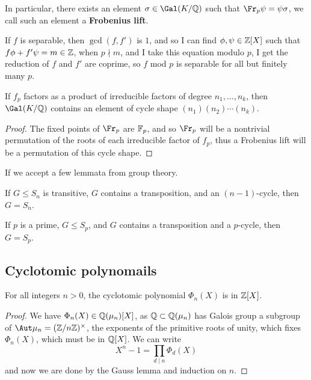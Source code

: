 \documentclass{article}
\begin{document}
In particular, there exists an element $\sigma\in \Gal(K/\bQ)$ such that $\Fr_p\psi = \psi\sigma$, we call such an element a \textbf{Frobenius lift}.

If $f$ is separable, then $\gcd(f,f')$ is $1$, and so I can find $\phi,\psi\in\mathbb{Z}[X]$ such that $f\phi + f'\psi = m\in \mathbb{Z}$, when $p\nmid m$, and I take this equation modulo $p$, I get the reduction of $f$ and $f'$ are coprime, so $f$ mod $p$ is separable for all but finitely many $p$.

\begin{corollary}
    If $f_p$ factors as a product of irreducible factors of degree $n_1,\ldots, n_k$, then $\Gal(K/\bQ)$ contains an element of cycle shape $(n_1)(n_2)\cdots (n_k)$.
    \begin{proof}
        The fixed points of $\Fr_p$ are $\mathbb{F}_p$, and so $\Fr_p$ will be a nontrivial permutation of the roots of each irreducible factor of $f_p$, thus a Frobenius lift will be a permutation of this cycle shape.
    \end{proof}
\end{corollary}

If we accept a few lemmata from group theory.

\begin{lemma}
    If $G\leq S_n$ is transitive, $G$ contains a transposition, and an $(n-1)$-cycle, then $G=S_n$.
\end{lemma}

\begin{lemma}
    If $p$ is a prime, $G\leq S_p$, and $G$ contains a transposition and a $p$-cycle, then $G=S_p$.
\end{lemma}

\subsection{Cyclotomic polynomails}

\begin{lemma}
    For all integers $n>0$, the cyclotomic polynomial $\Phi_n(X)$ is in $\mathbb{Z}[X]$.
    \begin{proof}
        We have $\Phi_n(X)\in\mathbb{Q}(\mu_n)[X]$, as $\mathbb{Q}\subset \mathbb{Q}(\mu_n)$ has Galois group a subgroup of $\Aut\mu_n = (\bZ/n\bZ)^\times$, the exponents of the primitive roots of unity, which fixes $\Phi_n(X)$, which must be in $\mathbb{Q}[X]$. We can write \[X^n-1 = \prod_{d\mid n}\Phi_d(X)\] and now we are done by the Gauss lemma and induction on $n$.
    \end{proof}
\end{lemma}
\end{document}
